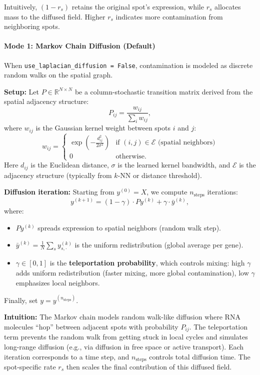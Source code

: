 \documentclass[11pt]{article}
\begin{document}
Intuitively, $(1-r_s)$ retains the original spot's expression, while $r_s$ allocates mass to the diffused field. Higher $r_s$ indicates more contamination from neighboring spots.

\paragraph{Mode 1: Markov Chain Diffusion (Default)}

When \texttt{use\_laplacian\_diffusion = False}, contamination is modeled as discrete random walks on the spatial graph.

\textbf{Setup:}
Let $P \in \mathbb{R}^{N \times N}$ be a column-stochastic transition matrix derived from the spatial adjacency structure:
\[
P_{ij} = \frac{w_{ij}}{\sum_i w_{ij}},
\]
where $w_{ij}$ is the Gaussian kernel weight between spots $i$ and $j$:
\[
w_{ij} = \begin{cases}
\exp\left(-\frac{d_{ij}^2}{2\sigma^2}\right) & \text{if } (i,j) \in \mathcal{E} \text{ (spatial neighbors)}\\
0 & \text{otherwise}.
\end{cases}
\]
Here $d_{ij}$ is the Euclidean distance, $\sigma$ is the learned kernel bandwidth, and $\mathcal{E}$ is the adjacency structure (typically from $k$-NN or distance threshold).

\textbf{Diffusion iteration:}
Starting from $y^{(0)} = X$, we compute $n_{\text{steps}}$ iterations:
\[
y^{(k+1)} = (1 - \gamma) \cdot P y^{(k)} + \gamma \cdot \bar{y}^{(k)},
\]
where:
\begin{itemize}
  \item $P y^{(k)}$ spreads expression to spatial neighbors (random walk step).
  \item $\bar{y}^{(k)} = \frac{1}{N}\sum_s y^{(k)}_{s,\cdot}$ is the uniform redistribution (global average per gene).
  \item $\gamma \in [0, 1]$ is the \textbf{teleportation probability}, which controls mixing: high $\gamma$ adds uniform redistribution (faster mixing, more global contamination), low $\gamma$ emphasizes local neighbors.
\end{itemize}

Finally, set $y = y^{(n_{\text{steps}})}$.

\textbf{Intuition:}
The Markov chain models random walk-like diffusion where RNA molecules ``hop'' between adjacent spots with probability $P_{ij}$. The teleportation term prevents the random walk from getting stuck in local cycles and simulates long-range diffusion (e.g., via diffusion in free space or active transport). Each iteration corresponds to a time step, and $n_{\text{steps}}$ controls total diffusion time. The spot-specific rate $r_s$ then scales the final contribution of this diffused field.
\end{document}
